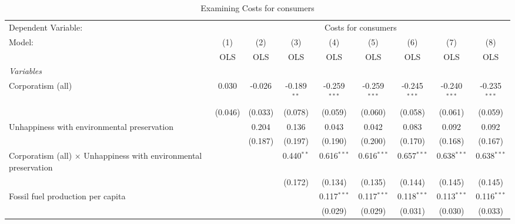 
\begin{table}[htbp]
   \caption{Examining Costs for consumers}
   \centering
   \begin{tabular}{lcccccccc}
      \toprule
      Dependent Variable: & \multicolumn{8}{c}{Costs for consumers}\\
      Model:                                                                  & (1)     & (2)     & (3)           & (4)            & (5)            & (6)            & (7)            & (8)\\  
                                                                              &  OLS    & OLS     & OLS           & OLS            & OLS            & OLS            & OLS            & OLS\\  
      \midrule
      \emph{Variables}\\
      Corporatism (all)                                                       & 0.030   & -0.026  & -0.189$^{**}$ & -0.259$^{***}$ & -0.259$^{***}$ & -0.245$^{***}$ & -0.240$^{***}$ & -0.235$^{***}$\\   
                                                                              & (0.046) & (0.033) & (0.078)       & (0.059)        & (0.060)        & (0.058)        & (0.061)        & (0.059)\\   
      Unhappiness with environmental preservation                             &         & 0.204   & 0.136         & 0.043          & 0.042          & 0.083          & 0.092          & 0.092\\   
                                                                              &         & (0.187) & (0.197)       & (0.190)        & (0.200)        & (0.170)        & (0.168)        & (0.167)\\   
      Corporatism (all) $\times$ Unhappiness with environmental preservation  &         &         & 0.440$^{**}$  & 0.616$^{***}$  & 0.616$^{***}$  & 0.657$^{***}$  & 0.638$^{***}$  & 0.638$^{***}$\\   
                                                                              &         &         & (0.172)       & (0.134)        & (0.135)        & (0.144)        & (0.145)        & (0.145)\\   
      Fossil fuel production per capita                                       &         &         &               & 0.117$^{***}$  & 0.117$^{***}$  & 0.118$^{***}$  & 0.113$^{***}$  & 0.116$^{***}$\\   
                                                                              &         &         &               & (0.029)        & (0.029)        & (0.031)        & (0.030)        & (0.033)\\   

\end{tabular}
\end{table}

